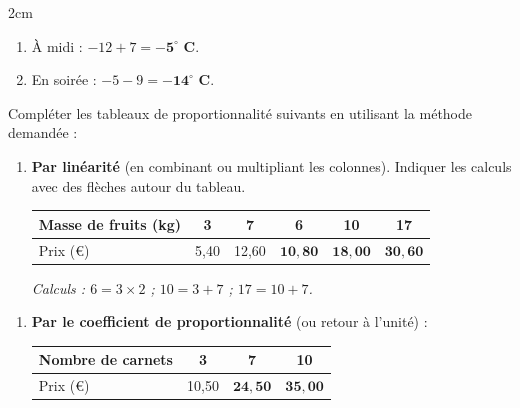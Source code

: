 \documentclass[a4paper]{book}
\begin{document}
{\begin{exercice}
        \begin{ZoneReponse}{2cm}
            \begin{enumerate}
                \item À midi : $-12 + 7 = \mathbf{-5^\circ}$ \textbf{C}.
                \item En soirée : $-5 - 9 = \mathbf{-14^\circ}$ \textbf{C}.
            \end{enumerate}
        \end{ZoneReponse}
    \end{exercice}
    
    
    \begin{exercice}
        Compléter les tableaux de proportionnalité suivants en utilisant la méthode demandée :
        \begin{enumerate}
            \item \textbf{Par linéarité} (en combinant ou multipliant les colonnes). Indiquer les calculs avec des flèches autour du tableau. 

            \vspace{0.5cm}
            
            \begin{center}
            \begin{tabular}{|l|c|c|c||c|c|}
            \hline
            Masse de fruits (kg) & 3 & 7 & 6 & 10 & 17 \\ \hline
            Prix (€) & 5,40 & 12,60 & $\mathbf{10,80}$ & $\mathbf{18,00}$ & $\mathbf{30,60}$ \\ \hline
            \end{tabular}
            \end{center}
            \textit{Calculs : $6 = 3 \times 2$ ; $10 = 3 + 7$ ; $17 = 10 + 7$.}
        \end{enumerate}

        
        \begin{enumerate}[resume]
            \item \textbf{Par le coefficient de proportionnalité} (ou retour à l'unité) :
            \begin{center}
            \begin{tabular}{|l|c|c|c|}
            \hline
            Nombre de carnets & 3 & 7 & 10 \\ \hline
            Prix (€) & 10,50 & $\mathbf{24,50}$ & $\mathbf{35,00}$ \\ \hline
            \end{tabular}
            \end{center}
        \end{enumerate}
        

\end{exercice}}
\end{document}
